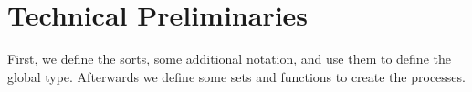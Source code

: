 \chapter{Technical Preliminaries}

First, we define the sorts, some additional notation, and use them to define the global type.
Afterwards we define some sets and functions to create the processes.
